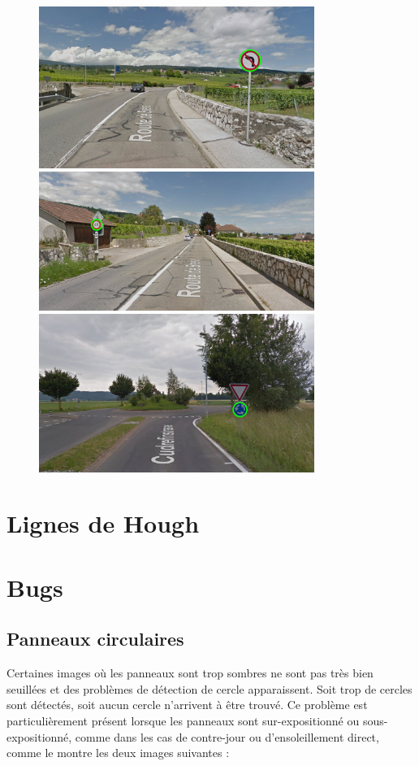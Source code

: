 \documentclass[a4paper,10pt,openany,oneside]{report}
\begin{document}
\begin{figure}[!h]
\centering
\includegraphics[width=0.8\textwidth]{../img/49-hough_circles.png}
\includegraphics[width=0.8\textwidth]{../img/59-hough_circles.png}
\includegraphics[width=0.8\textwidth]{../img/89-hough_circles.png}
\end{figure}
\pagebreak

\section{Lignes de Hough}


\section{Bugs}
\subsection{Panneaux circulaires}
Certaines images où les panneaux sont trop sombres ne sont pas très bien seuillées et des problèmes de détection de cercle apparaissent. Soit trop de cercles sont détectés, soit aucun cercle n'arrivent à être trouvé. Ce problème est particulièrement présent lorsque les panneaux sont sur-expositionné ou sous-expositionné, comme dans les cas de contre-jour ou d'ensoleillement direct, comme le montre les deux images suivantes :
\end{document}
